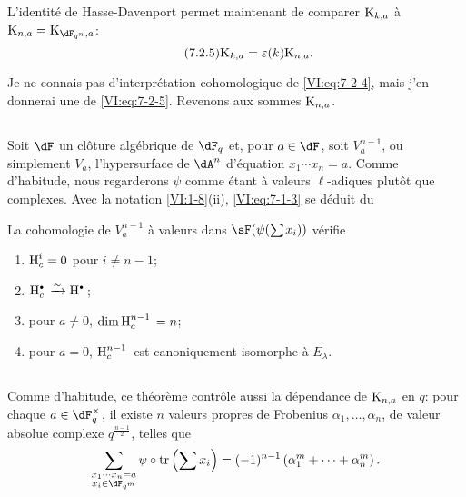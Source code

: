 L'identité de Hasse-Davenport permet maintenant de comparer $\textnormal{K}_{k,a}$ 
à $\kloos_{n,a} = \kloos_{\dF_{q^n},a}$: 
\begin{equation*}\tag{7.2.5}\label{VI:eq:7-2-5}
  \textnormal{K}_{k,a} = \varepsilon(k) \textnormal{K}_{n,a} \text{.} 
\end{equation*}

Je ne connais pas d'interprétation cohomologique de \eqref{VI:eq:7-2-4}, mais 
j'en donnerai une de \eqref{VI:eq:7-2-5}. Revenons aux sommes $\textnormal{K}_{n,a}$. 





\subsection{}\label{VI:7-3}

Soit $\dF$ un clôture algébrique de $\dF_q$ et, pour $a\in \dF$, soit 
$V_a^{n-1}$, ou simplement $V_a$, l'hypersurface de $\dA^n$ d'équation 
$x_1 \dotsm x_n=a$. Comme d'habitude, nous regarderons $\psi$ comme étant à 
valeurs $\ell$-adiques plutôt que complexes. Avec la notation 
\ref{VI:1-8}(ii), \eqref{VI:eq:7-1-3} se déduit du 





\begin{theorem_}\label{VI:7-4}
La cohomologie de $V_a^{n-1}$ à valeurs dans $\sF(\psi(\sum x_i))$ vérifie 
\begin{enumerate}[\indent (i)]
  \item $\operatorname{H}_c^i=0$ pour $i\ne n-1$; 
  \item $\h_c^\bullet{} \iso \h^\bullet{}$; 
  \item pour $a\ne 0$, $\dim \operatorname{H}_c^{n-1}{}=n$; 
  \item pour $a=0$, $\operatorname{H}_c^{n-1}{}$ est canoniquement isomorphe à $E_\lambda$. 
\end{enumerate}
\end{theorem_}





\subsection{}\label{VI:7-5}

Comme d'habitude, ce théorème contrôle aussi la dépendance de 
$\textnormal{K}_{n,a}$ en $q$: pour chaque $a\in \dF_q^\times$, il existe $n$ valeurs 
propres de Frobenius $\alpha_1,\dots,\alpha_n$, de valeur absolue complexe 
$q^{\frac{n-1}{2}}$, telles que 
\[
  \sum_{\substack{x_1\dotsm x_n = a \\ x_i\in \dF_{q^m}}} \psi\circ \tr\left(\sum x_i\right) = (-1)^{n-1} \left(\alpha_1^m + \cdots + \alpha_n^m \right) \text{.} 
\]

